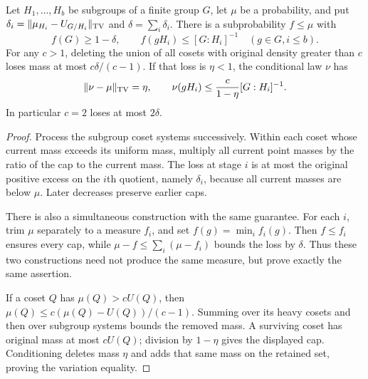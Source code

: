 \begin{lemma}\label{l:trim}
Let $H_1,\ldots,H_b$ be subgroups of a finite group $G$, let $\mu$ be a probability, and put $\delta_i=\|\mu_{H_i}-U_{G/H_i}\|_{\mathrm{TV}}$ and $\delta=\sum_i\delta_i$.
There is a subprobability $f\le\mu$ with
\[
 f(G)\ge1-\delta,\qquad f(gH_i)\le[G:H_i]^{-1}\quad(g\in G,i\le b).
\]
For any $c>1$, deleting the union of all cosets with original density greater than $c$ loses mass at most $c\delta/(c-1)$. If that loss is $\eta<1$, the conditional law $\nu$ has
\[
 \|\nu-\mu\|_{\mathrm{TV}}=\eta,\qquad \nu(gH_i)\le\frac{c}{1-\eta}[G:H_i]^{-1}.
\]
In particular $c=2$ loses at most $2\delta$.
\end{lemma}
\begin{proof}
Process the subgroup coset systems successively. Within each coset whose current mass exceeds its uniform mass, multiply all current point masses by the ratio of the cap to the current mass. The loss at stage $i$ is at most the original positive excess on the $i$th quotient, namely $\delta_i$, because all current masses are below $\mu$. Later decreases preserve earlier caps.

There is also a simultaneous construction with the same guarantee. For each $i$, trim $\mu$ separately to a measure $f_i$, and set $f(g)=\min_i f_i(g)$. Then $f\le f_i$ ensures every cap, while $\mu-f\le\sum_i(\mu-f_i)$ bounds the loss by $\delta$. Thus these two constructions need not produce the same measure, but prove exactly the same assertion.

If a coset $Q$ has $\mu(Q)>cU(Q)$, then $\mu(Q)\le c(\mu(Q)-U(Q))/(c-1)$. Summing over its heavy cosets and then over subgroup systems bounds the removed mass. A surviving coset has original mass at most $cU(Q)$; division by $1-\eta$ gives the displayed cap. Conditioning deletes mass $\eta$ and adds that same mass on the retained set, proving the variation equality.
\end{proof}

